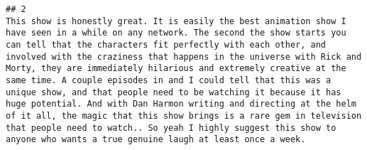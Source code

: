 \documentclass[
]{article}
\begin{document}
\begin{verbatim}
## 2                                                                                                                                                                                                                                                                                                                                                                                                                                                                                                                                                                                                                                                                                                                                                                                                                                                                                                                                                                                                                                                                                                                                                                                                                                                                                                                                                                                                                                                                                                                                                                                                                                                                                    This show is honestly great. It is easily the best animation show I have seen in a while on any network. The second the show starts you can tell that the characters fit perfectly with each other, and involved with the craziness that happens in the universe with Rick and Morty, they are immediately hilarious and extremely creative at the same time. A couple episodes in and I could tell that this was a unique show, and that people need to be watching it because it has huge potential. And with Dan Harmon writing and directing at the helm of it all, the magic that this show brings is a rare gem in television that people need to watch.. So yeah I highly suggest this show to anyone who wants a true genuine laugh at least once a week.

\end{verbatim}
\end{document}
